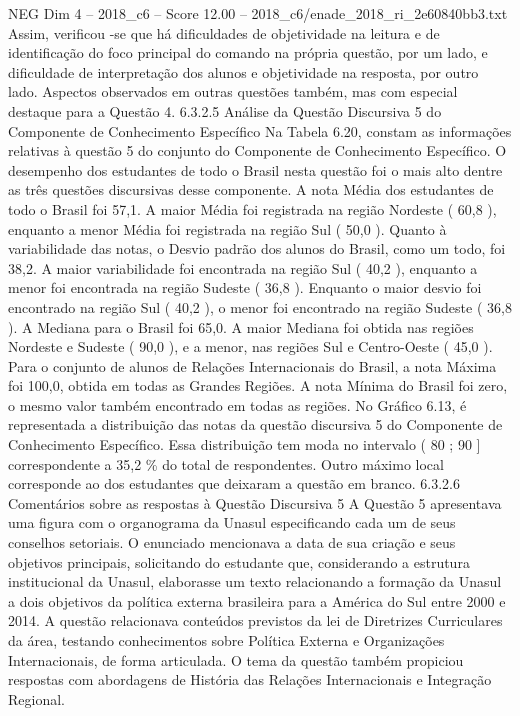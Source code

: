 \begin{textsample}{NEG Dim 4 – 2018\_c6 – Score 12.00 – 2018\_c6/enade\_2018\_ri\_2e60840bb3.txt}
Assim, verificou -se que há dificuldades de objetividade na leitura e de identificação do foco principal do comando na própria questão, por um lado, e dificuldade de interpretação dos alunos e objetividade na resposta, por outro lado.
Aspectos observados em outras questões também, mas com especial destaque para a Questão 4. 6.3.2.5 Análise da Questão Discursiva 5 do Componente de Conhecimento Específico Na Tabela 6.20, constam as informações relativas à questão 5 do conjunto do Componente de Conhecimento Específico.
O desempenho dos estudantes de todo o Brasil nesta questão foi o mais alto dentre as três questões discursivas desse componente.
A nota Média dos estudantes de todo o Brasil foi 57,1.
A maior Média foi registrada na região Nordeste ( 60,8 ), enquanto a menor Média foi registrada na região Sul ( 50,0 ).
Quanto à variabilidade das notas, o Desvio padrão dos alunos do Brasil, como um todo, foi 38,2.
A maior variabilidade foi encontrada na região Sul ( 40,2 ), enquanto a menor foi encontrada na região Sudeste ( 36,8 ).
Enquanto o maior desvio foi encontrado na região Sul ( 40,2 ), o menor foi encontrado na região Sudeste ( 36,8 ).
A Mediana para o Brasil foi 65,0.
A maior Mediana foi obtida nas regiões Nordeste e Sudeste ( 90,0 ), e a menor, nas regiões Sul e Centro-Oeste ( 45,0 ).
Para o conjunto de alunos de Relações Internacionais do Brasil, a nota Máxima foi 100,0, obtida em todas as Grandes Regiões.
A nota Mínima do Brasil foi zero, o mesmo valor também encontrado em todas as regiões.
No Gráfico 6.13, é representada a distribuição das notas da questão discursiva 5 do Componente de Conhecimento Específico.
Essa distribuição tem moda no intervalo ( 80 ; 90 ] correspondente a 35,2 \% do total de respondentes.
Outro máximo local corresponde ao dos estudantes que deixaram a questão em branco. 6.3.2.6 Comentários sobre as respostas à Questão Discursiva 5 A Questão 5 apresentava uma figura com o organograma da Unasul especificando cada um de seus conselhos setoriais.
O enunciado mencionava a data de sua criação e seus objetivos principais, solicitando do estudante que, considerando a estrutura institucional da Unasul, elaborasse um texto relacionando a formação da Unasul a dois objetivos da política externa brasileira para a América do Sul entre 2000 e 2014.
A questão relacionava conteúdos previstos da lei de Diretrizes Curriculares da área, testando conhecimentos sobre Política Externa e Organizações Internacionais, de forma articulada.
O tema da questão também propiciou respostas com abordagens de História das Relações Internacionais e Integração Regional.

\end{textsample}
